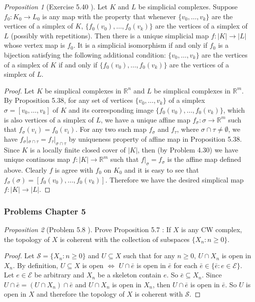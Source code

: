 \documentclass[a4paper]{article}
\theoremstyle{remark}
\newtheorem{prop}{Proposition}
\newcommand{\er}{\mathbb{R}} %
\newcommand{\rn}{\mathbb{R}^n} %
\newcommand{\subhim}{\subseteq} %
\begin{document}
\begin{prop}[Exercise 5.40 \cite{LeeTM}]
	Let $K$ and $L$ be simplicial complexes. Suppose $f_0 :  K_0 \to  L_0$ is any map with the property that whenever $\{v_0,\dots,v_k\}$ are the vertices of a simplex of $K$, $\{f_0(v_0),\dots,f_0(v_k)\}$ are the vertices of a simplex of $L$ (possibly with repetitions). Then there is a unique simplicial map $f : |K| \to |L|$ whose vertex map is $f_0$. It is a simplicial isomorphism
	if and only if $f_0$ is a bijection satisfying the following additional condition: $\{v_0,\dots,v_k\}$ are the vertices of a simplex of $K$ if and only if $\{f_0(v_0),\dots,f_0(v_k)\}$ are
	the vertices of a simplex of $L$.  
\end{prop}
\begin{proof}
	Let $K$ be simplical complexes in $\rn$ and $L$ be simplical complexes in $\er^m$. By Proposition 5.38, for any set of vertices $\{v_0,\dots,v_k\}$ of a simplex $\sigma= [v_0,\dots,v_k]$ of $K$ and its corresponding image $\{f_0(v_0),\dots,f_0(v_k)\}$, which is also vertices of a simplex of $L$, we have a unique affine map $f_{\sigma} : \sigma \to \er^m$ such that $f_{\sigma} (v_i) = f_0(v_i)$. For any two such map $f_{\sigma}$ and $f_{\tau}$, where $\sigma \cap \tau \neq \emptyset$, we have $f_{\sigma}|_{\sigma \cap \tau} = f_{\tau}|_{\sigma \cap \tau}$ by uniqueness property of affine map in Proposition 5.38. Since $K$ is a locally finite closed cover of $|K|$, then (by Problem 4.30) we have unique continous map $f : |K| \to \er^m$ such that $f|_{\sigma} = f_{\sigma}$ is the affine map defined above. Clearly $f$ is agree with $f_0$ on $K_0$ and it is easy to see that $f_{\sigma}(\sigma) = [f_0(v_0),\dots,f_0(v_k)]$. Therefore we have the desired simplical map $f: |K| \to |L|$. 
\end{proof}

\subsubsection*{Problems Chapter 5}


\begin{prop}[Problem 5.8 \cite{LeeTM}] Prove Proposition 5.7 : If $X$ is any CW complex, the topology of $X$ is coherent with the collection of subspaces $\{X_n : n \geq 0\}$. 
\end{prop}
\begin{proof}
	Let $\mathcal{S} = \{X_n: n\geq 0 \}$ and $U \subhim X$ such that for any $n \geq 0$, $U \cap X_n$ is open in $X_n$. By definition, $U \subhim X$ is open $\Leftrightarrow$ $U \cap \bar{e}$ is open in $\bar{e}$ for each $\bar{e} \in \{\bar{e} : e \in \mathcal{E}\}$. Let $e \in \mathcal{E}$ be arbitrary and $X_n$ be a skeleton contain $e$. So $\bar{e} \subhim X_n$. Since $U \cap  \bar{e} = (U \cap X_n) \cap \bar{e}$ and $U \cap X_n$ is open in $X_n$, then $U \cap \bar{e}$ is open in $\bar{e}$. So $U$ is open in $X$ and therefore the topology of $X$ is coherent with $\mathcal{S}$. 
\end{proof}
\end{document}
